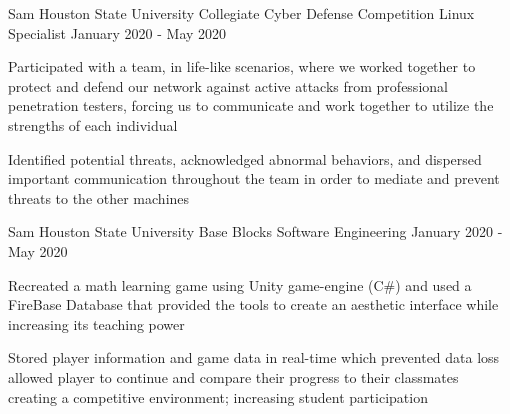 \begin{cventries}
	\cventry
	  {Sam Houston State University} %
	  {Collegiate Cyber Defense Competition} %
	  {Linux Specialist} %
      {January 2020 - May 2020} %
	  {
	    \begin{cvitems} %
			\item {Participated with a team, in life-like scenarios, where we worked together to protect and defend our network against active attacks from professional penetration testers, forcing us to communicate and work together to utilize the strengths of each individual}
			\item {Identified potential threats, acknowledged abnormal behaviors, and dispersed important communication throughout the team in order to mediate and prevent threats to the other machines}
		\end{cvitems}
	  }
    \cventry
      {Sam Houston State University} %
	  {Base Blocks} %
      {Software Engineering} %
      {January 2020 - May 2020} %
      {
        \begin{cvitems} %
		    \item {Recreated a math learning game using Unity game-engine (C\#) and used a FireBase Database that provided the tools to create an aesthetic interface while increasing its teaching power}
	        \item {Stored player information and game data in real-time which prevented data loss allowed player to continue and compare their progress to their classmates creating a competitive environment; increasing student participation}
       \end{cvitems}
      }


\end{cventries}

